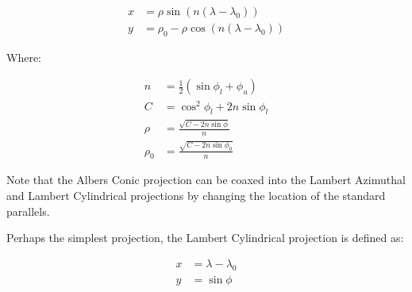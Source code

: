 \def\th{ n \left( \lambda - \lambda_0 \right) }
\begin{align}
x &= \rho \sin ( \th ) \\
y &= \rho_0 - \rho \cos ( \th )
\end{align}

Where:

\begin{align*}
n &= \frac{1}{2} (\sin \phi_l + \phi_u) \\
C &= \cos^2 \phi_l + 2n\sin \phi_l \\
\rho &= \frac{
           \sqrt{ C - 2n \sin \phi }
         } { n } \\
\rho_0 &= \frac{
           \sqrt{ C - 2n \sin \phi_0 }
         } { n }
\end{align*}

Note that the Albers Conic projection can be coaxed into the Lambert Azimuthal
  and Lambert Cylindrical projections by changing the location of the standard
  parallels.

Perhaps the simplest projection, the Lambert Cylindrical projection is defined
  as:

\begin{align}
x &= \lambda - \lambda_0  \\
y &= \sin \phi
\end{align}

